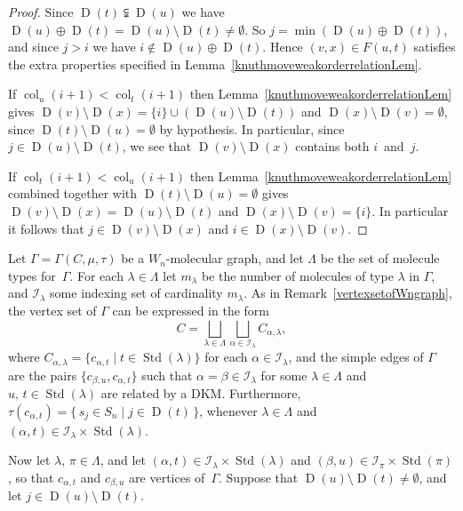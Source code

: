 \documentclass[ALCO,ThmDefs,Unicode,epreuves]{cedram}
\DeclareMathOperator{\col}{col}
\DeclareMathOperator{\STD}{Std}
\DeclareMathOperator{\D}{D}
\begin{document}
\begin{proof}
Since $\D(t)\subsetneqq\D(u)$ we have $\D(u)\oplus\D(t)=\D(u)\setminus\D(t)\neq\emptyset$.
So $j=\min(\D(u)\oplus\D(t))$, and since $j>i$ we have $i\notin\D(u)\oplus\D(t)$. Hence
$(v,x)\in F(u,t)$ satisfies
the extra properties specified in Lemma~\ref{knuthmoveweakorderrelationLem}.

If $\col_u(i+1)<\col_t(i+1)$ then Lemma~\ref{knuthmoveweakorderrelationLem} gives
$\D(v)\setminus\D(x)=\{i\}\cup(\D(u)\setminus\D(t))$ and $\D(x)\setminus\D(v)=\emptyset$,
since $\D(t)\setminus\D(u)=\emptyset$ by hypothesis. In particular, since $j\in\D(u)\setminus\D(t)$,
we see that $\D(v)\setminus\D(x)$ contains both $i$~and~$j$.

If $\col_t(i+1)<\col_u(i+1)$ then Lemma~\ref{knuthmoveweakorderrelationLem} combined together
with $\D(t)\setminus\D(u)=\emptyset$ gives
$\D(v)\setminus\D(x)=\D(u)\setminus\D(t)$ and $\D(x)\setminus\D(v)=\{i\}$.
In particular it follows that $j\in\D(v)\setminus\D(x)$ and $i\in\D(x)\setminus\D(v)$.
\end{proof}

Let $\Gamma=\Gamma(C,\mu,\tau)$ be a $W_n$-molecular graph, and let $\Lambda$
be the set of molecule types for~$\Gamma$. For each $\lambda\in\Lambda$ let
$m_{\lambda}$ be the number of molecules of type $\lambda$ in $\Gamma$, and
$\mathcal{I}_{\lambda}$ some indexing set of cardinality $m_{\lambda}$.
As in Remark~\ref{vertexsetofWngraph}, the
vertex set of $\Gamma$ can be expressed in the form
\begin{equation*}
C=\bigsqcup_{\lambda\in\Lambda}\bigsqcup_{\alpha\in\mathcal{I}_{\lambda}}C_{\alpha,\lambda},
\end{equation*}
where $C_{\alpha,\lambda}=\{c_{\alpha,t}\mid t\in\STD(\lambda)\}$ for each
$\alpha\in\mathcal{I}_{\lambda}$,
and the simple edges of $\Gamma$ are the pairs
$\{c_{\beta,u},c_{\alpha,t}\}$ such that $\alpha=\beta\in\mathcal{I}_{\lambda}$ for some $\lambda\in\Lambda$
and $u,\,t\in\STD(\lambda)$ are related by a DKM.
Furthermore, $\tau(c_{\alpha,t})=\{\,s_j\in S_n\mid j\in\D(t)\,\}$, whenever $\lambda\in\Lambda$ and
$(\alpha,t)\in\mathcal{I}_\lambda\times\STD(\lambda)$.

Now let $\lambda,\,\pi\in\Lambda$, and let $(\alpha,t)\in\mathcal{I}_\lambda\times\STD(\lambda)$ and
$(\beta,u)\in\mathcal{I}_\pi\times\STD(\pi)$, so that $c_{\alpha,t}$ and
$c_{\beta,u}$ are vertices of~$\Gamma$. Suppose that
$\D(u)\setminus\D(t)\neq\emptyset$, and let $j\in\D(u)\setminus\D(t)$.
\end{document}
